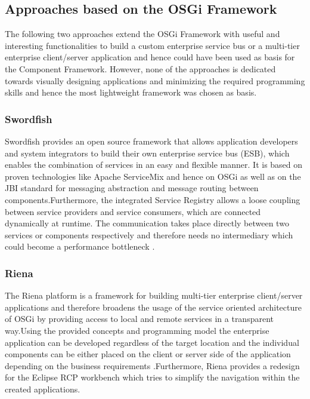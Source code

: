 \subsection{Approaches based on the OSGi Framework}
The following two approaches extend the OSGi Framework with useful and interesting functionalities
to build a custom enterprise service bus or a multi-tier enterprise client/server application and
hence could have been used as basis for the Component Framework. However, none of the approaches is
dedicated towards visually designing applications and minimizing the required programming skills
and hence the most lightweight framework was chosen as basis.

\subsubsection{Swordfish}
Swordfish \cite{swordfish} provides an open source framework that allows application developers and
system integrators to build their own enterprise service bus (ESB), which enables the combination of
services in an easy and flexible manner. It is based on proven technologies like Apache ServiceMix
and hence on OSGi as well as on the JBI standard for messaging abstraction and message routing
between components.\newline Furthermore, the integrated Service Registry allows a loose coupling
between service providers and service consumers, which are connected dynamically at runtime. The
communication takes place directly between two services or components respectively and therefore
needs no intermediary which could become a performance bottleneck \cite{swordfish_whitepaper}.

\subsubsection{Riena}
The Riena platform \cite{riena} is a framework for building multi-tier enterprise
client/\newline server applications and therefore broadens the usage of the service oriented
architecture of OSGi by providing access to local and remote services in a transparent way.\newline Using the provided
concepts and programming model the enterprise application can be developed regardless of the target
location and the individual components can be either placed on the client or server side of
the application depending on the business requirements \cite{eclipse_riena}.\newline Furthermore,
Riena provides a redesign for the Eclipse RCP workbench which tries to simplify the navigation
within the created applications.

